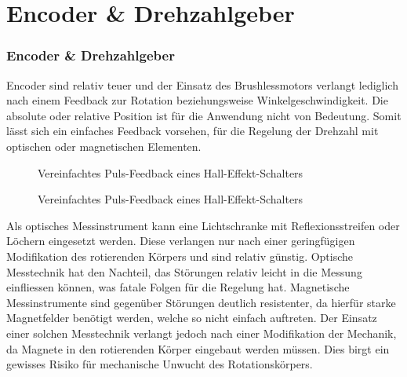 \ifSTANDALONE
\section{Encoder \& Drehzahlgeber}
\fi
\ifEMBED
\subsubsection{Encoder \& Drehzahlgeber}
\fi

Encoder sind relativ teuer und der Einsatz des Brushlessmotors verlangt
lediglich nach einem Feedback zur Rotation beziehungsweise Winkelgeschwindigkeit.
Die absolute oder relative Position ist für die Anwendung nicht von
Bedeutung. Somit lässt sich ein einfaches Feedback vorsehen, für die
Regelung der Drehzahl mit optischen oder magnetischen Elementen.
\ifSTANDALONE
\begin{figure}[h!]
	\centering
	\caption{Vereinfachtes Puls-Feedback eines Hall-Effekt-Schalters}
	\label{fig:hall-effekt-schalter}
\end{figure}
\fi
\ifEMBED
\begin{figure}[h!]
	\centering
	\caption{Vereinfachtes Puls-Feedback eines Hall-Effekt-Schalters}
	\label{fig:hall-effekt-schalter}
\end{figure}
\fi
Als optisches Messinstrument kann eine Lichtschranke mit 
Reflexionsstreifen oder Löchern eingesetzt werden. Diese verlangen
nur nach einer geringfügigen Modifikation des rotierenden Körpers und
sind relativ günstig. Optische Messtechnik hat den Nachteil, das
Störungen relativ leicht in die Messung einfliessen können, was fatale
Folgen für die Regelung hat. Magnetische Messinstrumente sind gegenüber
Störungen deutlich resistenter, da hierfür starke Magnetfelder benötigt
werden, welche so nicht einfach auftreten. Der Einsatz einer solchen Messtechnik
verlangt jedoch nach einer Modifikation der Mechanik, da Magnete in den
rotierenden Körper eingebaut werden müssen. Dies birgt ein gewisses
Risiko für mechanische Unwucht des Rotationskörpers.

